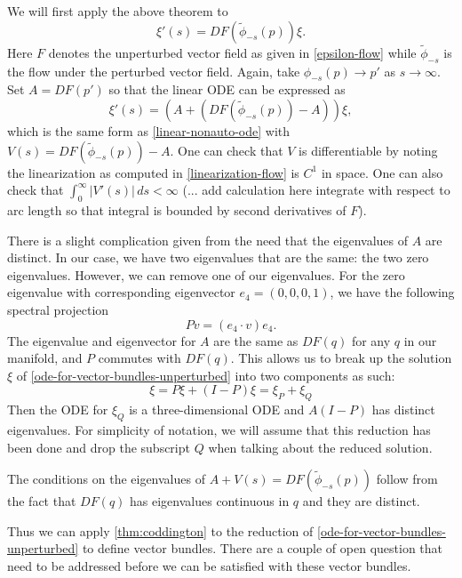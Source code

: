 We will first apply the above theorem to 
\begin{equation}\label{flow-for-tangent-vectors-unperturbed}
	\xi'(s) = DF(\tilde \phi_{-s}(p)) \xi.
\end{equation}
Here \(F\) denotes the unperturbed vector field as given in \cref{epsilon-flow} while \(\tilde\phi_{-s}\) is the flow under the perturbed vector field. Again, take \(\phi_{-s}(p) \to p'
\) as \(s\to \infty\). Set \(A = DF(p')\) so that the linear ODE can be expressed as
\begin{equation}\label{ode-for-vector-bundles-unperturbed}
	\xi'(s) = (A + (DF(\tilde \phi_{-s}(p)) - A)) \xi,
\end{equation}
which is the same form as \cref{linear-nonauto-ode} with \(V(s) = DF(\tilde \phi_{-s}(p)) - A\). One can check that \(V\) is differentiable by noting the linearization as computed in \cref{linearization-flow} is \(C^1\) in space. One can also check that \(\int_{0}^\infty |V'(s)|\, ds < \infty\) (... add calculation here integrate with respect to arc length so that integral is bounded by second derivatives of \(F\)).

There is a slight complication given from the need that the eigenvalues of \(A\) are distinct. In our case, we have two eigenvalues that are the same: the two zero eigenvalues. However, we can remove one of our eigenvalues. For the zero eigenvalue with corresponding eigenvector \(e_4 = (0, 0, 0, 1)\), we have the following spectral projection
\begin{equation}
	P v = (e_4 \cdot v) e_4.
\end{equation}
The eigenvalue and eigenvector for \(A\) are the same as \(DF(q)\) for any \(q\) in our manifold, and \(P\) commutes with \(DF(q)\). This allows us to break up the solution \(\xi\) of \cref{ode-for-vector-bundles-unperturbed} into two components as such:
\begin{equation}
	\xi = P\xi + (I-P)\xi = \xi_P + \xi_Q
\end{equation}
Then the ODE for \(\xi_Q\) is a three-dimensional ODE and \(A(I-P)\) has distinct eigenvalues. For simplicity of notation, we will assume that this reduction has been done and drop the subscript \(Q\) when talking about the reduced solution.

The conditions on the eigenvalues of \(A+V(s) = DF(\tilde\phi_{-s}(p))\) follow from the fact that \(DF(q)\) has eigenvalues continuous in \(q\) and they are distinct.

Thus we can apply \cref{thm:coddington} to the reduction of \cref{ode-for-vector-bundles-unperturbed} to define vector bundles. There are a couple of open question that need to be addressed before we can be satisfied with these vector bundles. 

